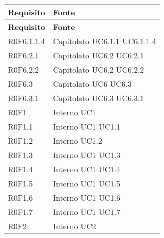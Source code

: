 \def\arraystretch{1.5}
\begin{longtable}{p{2.5cm}!{\VRule[1pt]}p{2.5cm}}
\color{white} \textbf{Requisito} & \color{white} \textbf{Fonte} \\ 
\endfirsthead 
{} 
\color{white} \textbf{Requisito} & \color{white} \textbf{Fonte} \\ 
\endhead 
R0F6.1.1.4 & Capitolato \newline UC6.1.1
 \newline UC6.1.1.4
 \\
R0F6.2.1 & Capitolato \newline UC6.2
 \newline UC6.2.1
 \\
R0F6.2.2 & Capitolato \newline UC6.2
 \newline UC6.2.2
 \\
R0F6.3 & Capitolato \newline UC6
 \newline UC6.3
 \\
R0F6.3.1 & Capitolato \newline UC6.3
 \newline UC6.3.1
 \\
R0F1 & Interno \newline UC1
 \\
R0F1.1 & Interno \newline UC1
 \newline UC1.1
 \\
R0F1.2 & Interno \newline UC1.2
 \\
R0F1.3 & Interno \newline UC1
 \newline UC1.3
 \\
R0F1.4 & Interno \newline UC1
 \newline UC1.4
 \\
R0F1.5 & Interno \newline UC1
 \newline UC1.5
 \\
R0F1.6 & Interno \newline UC1
 \newline UC1.6
 \\
R0F1.7 & Interno \newline UC1
 \newline UC1.7
 \\
R0F2 & Interno \newline UC2

\end{longtable}
